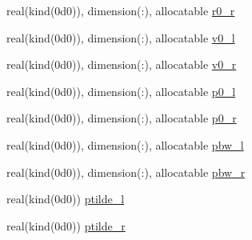 \begin{Indent}
\begin{DoxyCompactItemize}
real(kind(0d0)), dimension(\+:), allocatable \hyperlink{namespacem__riemann__solvers_a132ff53b628e32e8d047d3a3f983b933}{r0\+\_\+r}
\item 
real(kind(0d0)), dimension(\+:), allocatable \hyperlink{namespacem__riemann__solvers_af425cfd91bc8a567e44b36c9bdbfb2bc}{v0\+\_\+l}
\item 
real(kind(0d0)), dimension(\+:), allocatable \hyperlink{namespacem__riemann__solvers_a1bf4d8c27c1ed947af13b86a63f5b3aa}{v0\+\_\+r}
\item 
real(kind(0d0)), dimension(\+:), allocatable \hyperlink{namespacem__riemann__solvers_a2b69a3c582d14aba043c3cb6376335a5}{p0\+\_\+l}
\item 
real(kind(0d0)), dimension(\+:), allocatable \hyperlink{namespacem__riemann__solvers_aa7deddacb25e873c573761963f680efc}{p0\+\_\+r}
\item 
real(kind(0d0)), dimension(\+:), allocatable \hyperlink{namespacem__riemann__solvers_a31ac5fad05a69c3c0c76fbdc872f5494}{pbw\+\_\+l}
\item 
real(kind(0d0)), dimension(\+:), allocatable \hyperlink{namespacem__riemann__solvers_af14a2b29ba2692adfb1ed257e91482e8}{pbw\+\_\+r}
\item 
real(kind(0d0)) \hyperlink{namespacem__riemann__solvers_abeca9cdf8ede1fe479660ab70ff789c7}{ptilde\+\_\+l}
\item 
real(kind(0d0)) \hyperlink{namespacem__riemann__solvers_addd3d84b7a9bae473b0c17744d5cac31}{ptilde\+\_\+r}
\end{DoxyCompactItemize}
\end{Indent}
